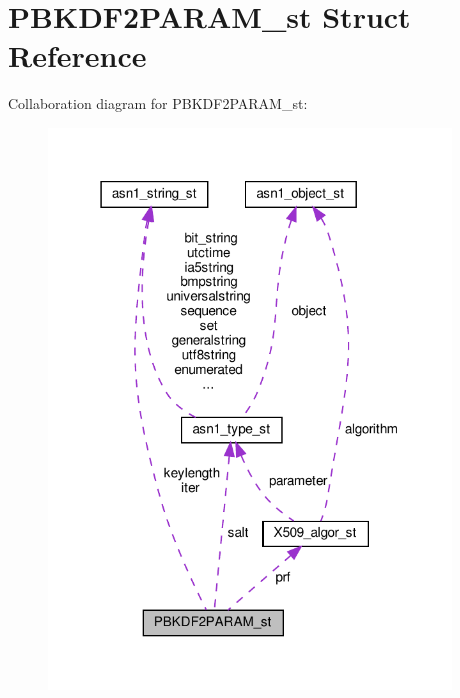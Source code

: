 \hypertarget{structPBKDF2PARAM__st}{}\section{P\+B\+K\+D\+F2\+P\+A\+R\+A\+M\+\_\+st Struct Reference}
\label{structPBKDF2PARAM__st}


Collaboration diagram for P\+B\+K\+D\+F2\+P\+A\+R\+A\+M\+\_\+st\+:
\nopagebreak
\begin{figure}[H]
\begin{center}
\leavevmode
\includegraphics[width=303pt]{structPBKDF2PARAM__st__coll__graph}
\end{center}
\end{figure}
